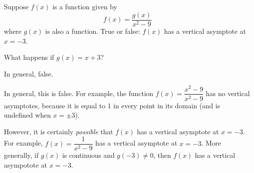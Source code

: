 %
%
\subsection*{\Conceptual}

\begin{Mquestion}
Suppose $f(x)$ is a function given by
\[f(x)= \frac{g(x)}{x^2-9}\]
where $g(x)$ is also a function. True or false: $f(x)$ has a vertical asymptote at $x=-3$.
\end{Mquestion}
\begin{hint}
What happens if $g(x)=x+3$?
\end{hint}
\begin{answer}
In general, false.
\end{answer}
\begin{solution}
In general, this is false. For example, the function $f(x) = \dfrac{x^2-9}{x^2-9}$ has no vertical asymptotes, because it is equal to 1 in every point in its domain (and is undefined when $x=\pm3$).

However, it is certainly \emph{possible} that $f(x)$ has a vertical asymptote at $x=-3$. For example, $f(x)=\dfrac{1}{x^2-9}$ has a vertical asymptote at $x=-3$.  More generally, if $g(x)$ is continuous and $g(-3)\ne 0$,
          then $f(x)$ has a vertical asympotote at $x=-3$.
\end{solution}
\subsection*{\Procedural}


